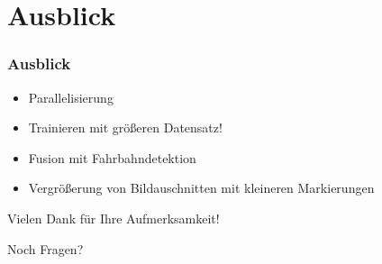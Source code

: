 \documentclass[t]{beamer}
\begin{document}
\section{Ausblick}
\begin{frame}
	\frametitle{Ausblick}
	\bigskip
	\begin{itemize}
		\item Parallelisierung 
		\item Trainieren mit größeren Datensatz!
		\item Fusion mit Fahrbahndetektion
		\item Vergrößerung von Bildauschnitten mit kleineren Markierungen
	\end{itemize}
\end{frame}

\begin{frame}[c]
\begin{center}
\Huge{Vielen Dank für Ihre Aufmerksamkeit!}
\end{center}
\end{frame}

\begin{frame}[c]
\begin{center}
\Huge{Noch Fragen?}
\end{center}
\end{frame}



%
%
%
\end{document}
